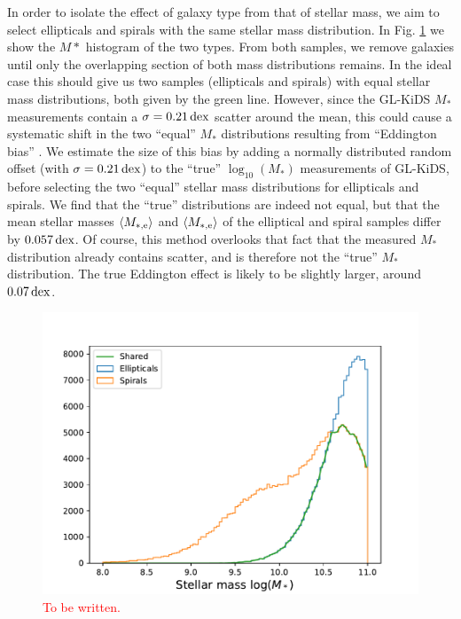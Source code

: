 \documentclass[usenatbib]{mnras}
\newcommand{\lan}{\langle}
\newcommand{\ran}{\rangle}
\newcommand{\un}[1]{_{\rm #1}}
\newcommand{\dex}{\, {\rm dex}}
\begin{document}
In order to isolate the effect of galaxy type from that of stellar mass, we aim to select ellipticals and spirals with the same stellar mass distribution. In Fig. \ref{fig:galtypes_masshist} we show the $M*$ histogram of the two types. From both samples, we remove galaxies until only the overlapping section of both mass distributions remains. In the ideal case this should give us two samples (ellipticals and spirals) with equal stellar mass distributions, both given by the green line. However, since the GL-KiDS $M_*$ measurements contain a $\sigma = 0.21 \dex$ scatter around the mean, this could cause a systematic shift in the two ``equal'' $M_*$ distributions resulting from ``Eddington bias'' \cite[]{eddington1913}. We estimate the size of this bias by adding a normally distributed random offset (with $\sigma = 0.21 \dex$) to the ``true'' $\log_{10}(M_*)$ measurements of GL-KiDS, before selecting the two ``equal'' stellar mass distributions for ellipticals and spirals. We find that the ``true'' distributions are indeed not equal, but that the mean stellar masses $\lan M\un{*,e} \ran$ and $\lan M\un{*,e} \ran$ of the elliptical and spiral samples differ by $0.057 \dex$. Of course, this method overlooks that fact that the measured $M_*$ distribution already contains scatter, and is therefore not the ``true'' $M_*$ distribution. The true Eddington effect is likely to be slightly larger, around $0.07 \dex$.

\begin{figure}
	\includegraphics[width=\columnwidth]{Figures/mass_range_selection.pdf}
	\caption{\textcolor{red}{To be written.}}
	\label{fig:galtypes_masshist}
\end{figure}
\end{document}
